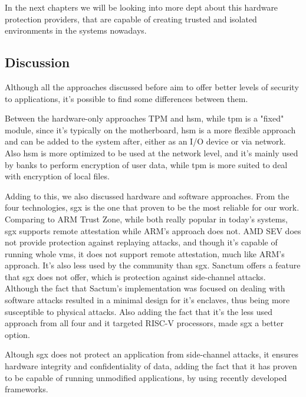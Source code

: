 In the next chapters we will be looking into more dept about this hardware protection providers, that are capable of creating trusted and isolated environments in the systems nowadays.




\subsection{Discussion}
\label{ssec:tee_discussion}

Although all the approaches discussed before aim to offer better levels of security to applications, it's possible to find some differences between them. 

Between the hardware-only approaches TPM and \gls{hsm}, while \gls{tpm} is a "fixed" module, since it's typically on the motherboard, \gls{hsm} is a more flexible approach and can be added to the system after, either as an I/O device or via network. Also \gls{hsm} is more optimized to be used at the network level, and it's mainly used by banks to perform encryption of user data, while \gls{tpm} is more suited to deal with encryption of local files.

Adding to this, we also discussed hardware and software approaches. 
From the four technologies, \gls{sgx} is the one that proven to be the most reliable for our work. Comparing to ARM Trust Zone, while both really popular in today's systems, \gls{sgx} supports remote attestation while ARM's approach does not. AMD SEV does not provide protection against replaying attacks, and though it's capable of running whole \gls{vm}s, it does not support remote attestation, much like ARM's approach. It's also less used by the community than \gls{sgx}. Sanctum offers a feature that \gls{sgx} does not offer, which is protection against side-channel attacks. Although the fact that Sactum's implementation was focused on dealing with software attacks resulted in a minimal design for it's enclaves, thus being more susceptible to physical attacks. Also adding the fact that it's the less used approach from all four and it targeted RISC-V processors, made \gls{sgx} a better option.

Altough \gls{sgx} does not protect an application from side-channel attacks, it ensures hardware integrity and confidentiality of data, adding the fact that it has proven to be capable of running unmodified applications, by using recently developed frameworks.





